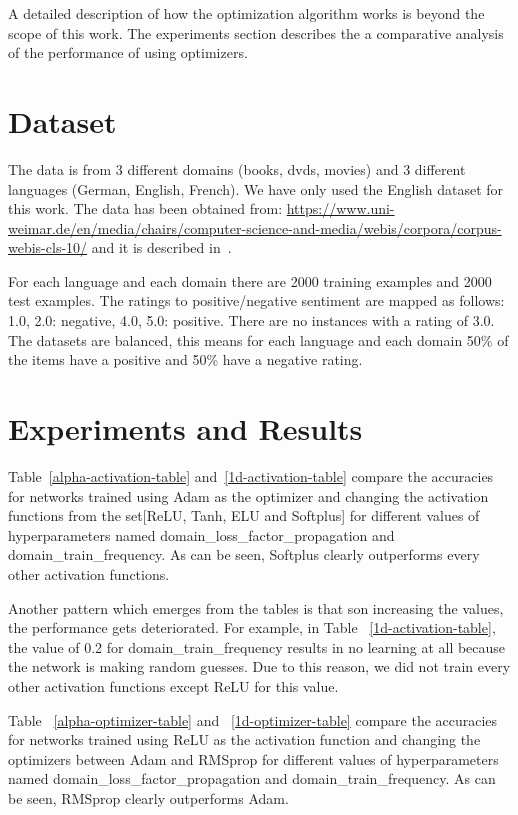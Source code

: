\documentclass[11pt,a4paper]{article}
\begin{document}
A detailed description of how the optimization algorithm works is beyond the scope of this work. The experiments section describes the a comparative analysis of the performance of using optimizers.


\section{Dataset}
The data is from 3 different domains (books, dvds, movies) and 3 different languages (German, English, French).
We have only used the English dataset for this work. The data has been obtained from: \url{https://www.uni-weimar.de/en/media/chairs/computer-science-and-media/webis/corpora/corpus-webis-cls-10/} and it is described in~\cite{PB:2010}.

For each language and each domain there are 2000 training examples and 2000 test examples. The ratings to positive/negative sentiment are mapped as follows: 1.0, 2.0: negative, 4.0, 5.0: positive. There are no instances with a rating of 3.0. The datasets are balanced, this means for each language and each domain 50\% of the items have a positive and 50\% have a negative rating.

\section{Experiments and Results}
Table~\ref{alpha-activation-table} and~\ref{1d-activation-table} compare the accuracies for networks trained using Adam as the optimizer and changing the activation functions from the set[ReLU, Tanh, ELU and Softplus] for different values of hyperparameters named domain\_loss\_factor\_propagation and domain\_train\_frequency. As can be seen, Softplus clearly outperforms every other activation functions.

Another pattern which emerges from the tables is that son increasing the values, the performance gets deteriorated. For example, in Table ~\ref{1d-activation-table}, the value of 0.2 for domain\_train\_frequency results in no learning at all because the network is making random guesses. Due to this reason, we did not train every other activation functions except ReLU for this value.

Table ~\ref{alpha-optimizer-table} and ~\ref{1d-optimizer-table} compare the accuracies for networks trained using ReLU as the activation function and changing the optimizers between Adam and RMSprop for different values of hyperparameters named domain\_loss\_factor\_propagation and domain\_train\_frequency. As can be seen, RMSprop clearly outperforms Adam.
\end{document}
